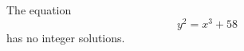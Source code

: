 \begin{proposition}
    The equation
\[
    y^2=x^3+58
\]
    has no integer solutions.
\end{proposition}
